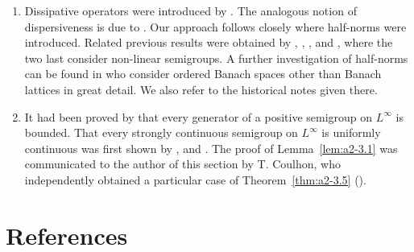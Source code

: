 \begin{enumerate}[label=\emph{Section \arabic*:}, wide, itemsep=1ex]
The characterization of a core as \enquote{domain of uniqueness} given in Theorem~\ref{thm:a2-1.33}   seems to be new.
In this section we have presented part of the standard theory of one-parameter semigroups including some new aspects.
A very elegant brief introduction to one-parameter semigroups is given in the treatise of \textcite{kato:1976} where one can also find all the results on perturbation theory going beyond the elementary facts we discuss here.
A complete information on the general theory can be obtained by consulting the books of \textcite{davies:1980}, \textcite{goldstein:1985a} and \textcite{pazy:1983}.
The monograph of \textcite{goldstein:1985a} contains a variety of examples and applications.

\item 
Dissipative operators were introduced by \textcite{lumerphillips:1961}.
The analogous notion of dispersiveness is due to \textcite{phillips:1962}.
Our approach follows closely \textcite{arendtchernoffkato:1982} where half-norms were introduced.
Related previous results were obtained by \textcite{calvert:1971a}, \textcite{hasegawa:1966}, \textcite{sato:1968}, \textcite{benilanpicard:1979} and \textcite{picard:1972}, where the two last consider non-linear semigroups.
A further investigation of half-norms can be found in \textcite{battyrobinson:1984} who consider ordered Banach spaces other than Banach lattices in great detail.
We also refer to the historical notes given there.

\item
It had been proved by \textcite{kishimotorobinson:1981} that every generator of a positive semigroup on $L^{\infty}$ is bounded.
That every strongly continuous semigroup on $L^{\infty}$ is uniformly continuous was first shown by \textcite{lotz:1982}, \textcite{lotz:1984} and \textcite{lotz:1985}.
The proof of Lemma~\ref{lem:a2-3.1}  was communicated to the author of this section by T. Coulhon, who independently obtained a particular case of Theorem~\ref{thm:a2-3.5} (\textcite{coulhon:1984}).

\end{enumerate}
\section*{References}
{\RaggedRight
  \printbibliography[heading=none]
 }

